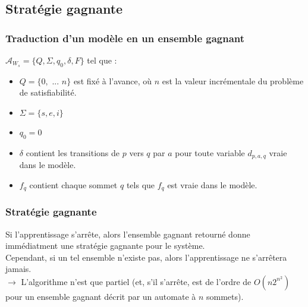 \documentclass{beamer}
\begin{document}
\subsection{Stratégie gagnante}
\begin{frame}
\frametitle{Traduction d'un modèle en un ensemble gagnant}
$\mathcal{A}_{W_s}=\{Q,\Sigma,q_0,\delta,F\}$ tel que :
\begin{itemize}
\item $Q=\{0,$ $...$ $n\}$ est fixé à l'avance, où $n$ est la valeur incrémentale du problème de satisfiabilité.
\item $\Sigma=\{s,e,i\}$ 
\item $q_0=0$
\item $\delta$ contient les transitions de $p$ vers $q$ par $a$ pour toute variable $d_{p,a,q}$ vraie dans le modèle.
\item $f_q$ contient chaque sommet $q$ tels que $f_q$ est vraie dans le modèle.
\end{itemize}
\end{frame}

\begin{frame}
\frametitle{Stratégie gagnante}
Si l'apprentissage s'arrête, alors l'ensemble gagnant retourné donne immédiatment une stratégie gagnante pour le système.\\[3mm]
Cependant, si un tel ensemble n'existe pas, alors l'apprentissage ne s'arrêtera jamais.\\[6mm]
$\rightarrow$ L'algorithme n'est que partiel (et, s'il s'arrête, est de l'ordre de \alert{$O(n2^{n^2})$} pour un ensemble gagnant décrit par un automate à $n$ sommets).
\end{frame}
\end{document}
